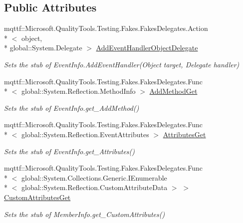 \subsection*{Public Attributes}
\begin{DoxyCompactItemize}
\item 
mqttf\-::\-Microsoft.\-Quality\-Tools.\-Testing.\-Fakes.\-Fakes\-Delegates.\-Action\\*
$<$ object, \\*
global\-::\-System.\-Delegate $>$ \hyperlink{class_system_1_1_reflection_1_1_fakes_1_1_stub_event_info_aee3152623971856b7659510c1be6197a}{Add\-Event\-Handler\-Object\-Delegate}
\begin{DoxyCompactList}\small\item\em Sets the stub of Event\-Info.\-Add\-Event\-Handler(\-Object target, Delegate handler)\end{DoxyCompactList}\item 
mqttf\-::\-Microsoft.\-Quality\-Tools.\-Testing.\-Fakes.\-Fakes\-Delegates.\-Func\\*
$<$ global\-::\-System.\-Reflection.\-Method\-Info $>$ \hyperlink{class_system_1_1_reflection_1_1_fakes_1_1_stub_event_info_a6c9e2d85de7f4bac0a8c87bfde87475d}{Add\-Method\-Get}
\begin{DoxyCompactList}\small\item\em Sets the stub of Event\-Info.\-get\-\_\-\-Add\-Method()\end{DoxyCompactList}\item 
mqttf\-::\-Microsoft.\-Quality\-Tools.\-Testing.\-Fakes.\-Fakes\-Delegates.\-Func\\*
$<$ global\-::\-System.\-Reflection.\-Event\-Attributes $>$ \hyperlink{class_system_1_1_reflection_1_1_fakes_1_1_stub_event_info_a34ba5be0f8bead05c00ff04863e0c199}{Attributes\-Get}
\begin{DoxyCompactList}\small\item\em Sets the stub of Event\-Info.\-get\-\_\-\-Attributes()\end{DoxyCompactList}\item 
mqttf\-::\-Microsoft.\-Quality\-Tools.\-Testing.\-Fakes.\-Fakes\-Delegates.\-Func\\*
$<$ global\-::\-System.\-Collections.\-Generic.\-I\-Enumerable\\*
$<$ global\-::\-System.\-Reflection.\-Custom\-Attribute\-Data $>$ $>$ \hyperlink{class_system_1_1_reflection_1_1_fakes_1_1_stub_event_info_a81fa0de8aa5c6aebeb5fd17b64393b23}{Custom\-Attributes\-Get}
\begin{DoxyCompactList}\small\item\em Sets the stub of Member\-Info.\-get\-\_\-\-Custom\-Attributes()\end{DoxyCompactList}\item 

\end{DoxyCompactItemize}
